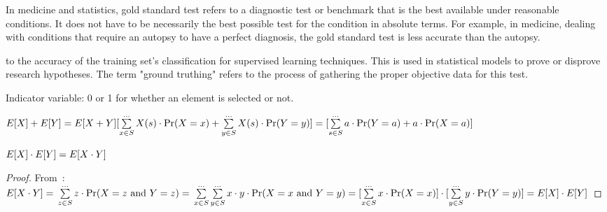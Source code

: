 \begin{definition}
In medicine and statistics, gold standard test refers to a diagnostic test or
benchmark that is the best available under reasonable conditions. It does
not have to be necessarily the best possible test for the condition in absolute
terms. For example, in medicine, dealing with conditions that require an
autopsy to have a perfect diagnosis, the gold standard test is less accurate
than the autopsy.

\end{definition}

\begin{definition}
    to the accuracy of the training set's classification for supervised
    learning techniques. This is used in statistical models to prove or
    disprove research hypotheses. The term "ground truthing" refers to the
    process of gathering the proper objective data for this test.

\end{definition}

\begin{definition}
    Indicator variable: 0 or 1 for whether an element is selected or not.
\end{definition}


\begin{definition}\label{lin_expect}
    $ E[X] + E[Y] = E[X + Y] \newline
    [\sum\limits_{x \in S}^{\dots} X(s) \cdot \Pr(X = x) +
    \sum\limits_{y \in S}^{\dots} X(s) \cdot \Pr(Y = y) ] \newline
    = [\sum\limits_{s \in S}^{\dots} a \cdot \Pr(Y = a) + a \cdot \Pr(X = a) ]
    $
\end{definition}

\begin{theorem}
    $ \newline E[X] \cdot E[Y] = E[X \cdot Y]$
\end{theorem}
\begin{proof}
    From~: \newline
    $
    E[X \cdot Y] = \newline \sum\limits_{z \in S}^{\dots} z \cdot 
        \Pr(X = z \text{ and } Y = z) = \newline
    \sum\limits_{x \in S}^{\dots}\sum\limits_{y \in S}^{\dots} x \cdot y
    \cdot \Pr(X = x \text{ and } Y=y) = \newline
    [\sum\limits_{x \in S}^{\dots} x \cdot \Pr(X = x)] \cdot  
    [\sum\limits_{y \in S}^{\dots} y \cdot \Pr(Y = y)]  = \newline
    E[X] \cdot E[Y]
    $
\end{proof}

